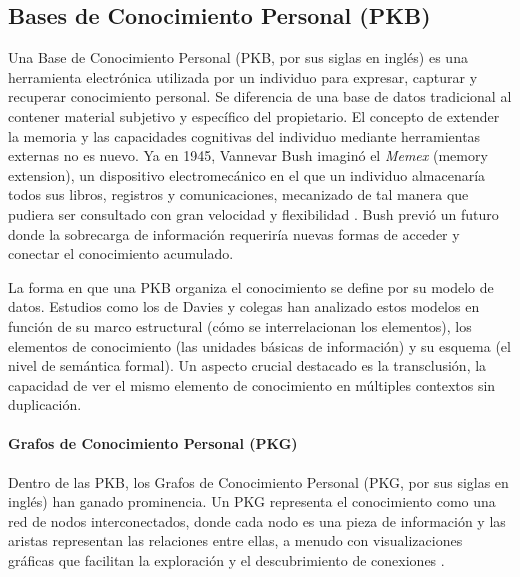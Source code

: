 \subsection{Bases de Conocimiento Personal (PKB)}
\label{subsec:pkb}
Una Base de Conocimiento Personal (PKB, por sus siglas en inglés) es una herramienta electrónica utilizada por un individuo para expresar, capturar y recuperar conocimiento personal. Se diferencia de una base de datos tradicional al contener material subjetivo y específico del propietario. El concepto de extender la memoria y las capacidades cognitivas del individuo mediante herramientas externas no es nuevo. Ya en 1945, Vannevar Bush imaginó el \textit{Memex} (memory extension), un dispositivo electromecánico en el que un individuo almacenaría todos sus libros, registros y comunicaciones, mecanizado de tal manera que pudiera ser consultado con gran velocidad y flexibilidad \parencite{bushWeMayThink1945}. Bush previó un futuro donde la sobrecarga de información requeriría nuevas formas de acceder y conectar el conocimiento acumulado.

La forma en que una PKB organiza el conocimiento se define por su modelo de datos. Estudios como los de Davies y colegas \parencite{daviesBuildingMemexSixty, daviesStillBuildingMemex2011} han analizado estos modelos en función de su marco estructural (cómo se interrelacionan los elementos), los elementos de conocimiento (las unidades básicas de información) y su esquema (el nivel de semántica formal). Un aspecto crucial destacado es la transclusión, la capacidad de ver el mismo elemento de conocimiento en múltiples contextos sin duplicación.

\paragraph{Grafos de Conocimiento Personal (PKG)}
Dentro de las PKB, los Grafos de Conocimiento Personal (PKG, por sus siglas en inglés) han ganado prominencia. Un PKG representa el conocimiento como una red de nodos interconectados, donde cada nodo es una pieza de información y las aristas representan las relaciones entre ellas, a menudo con visualizaciones gráficas que facilitan la exploración y el descubrimiento de conexiones \parencite{pyneMetaworkHowWe2022}.

